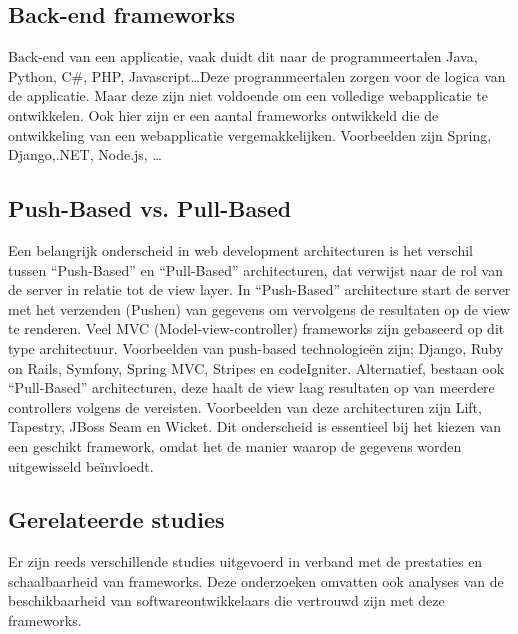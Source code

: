 \documentclass{hogent-article}
\begin{document}
\subsection{Back-end frameworks}%
\label{sub:backend_frameworks}
Back-end van een applicatie, vaak duidt dit naar de programmeertalen Java, Python, C\#, PHP, Ja\-va\-script\ldots  Deze programmeertalen zorgen voor de logica van de applicatie. Maar deze zijn niet voldoende om een volledige webapplicatie te ontwikkelen. Ook hier zijn er een aantal frameworks ontwikkeld die de ontwikkeling van een webapplicatie vergemakkelijken.
Voorbeelden zijn Spring, Django,.NET, Node.js, \ldots\autocite{Kaluza2019}

\subsection{Push-Based vs. Pull-Based}%
Een belangrijk onderscheid in web development architecturen is het verschil tussen ``Push-Based'' en ``Pull-Based'' architecturen, dat verwijst naar de rol van de server in relatie tot de view layer.\autocite{Lomas2022}
\bigbreak
In ``Push-Based'' architecture start de server met het verzenden (Pushen) van gegevens om vervolgens de resultaten op de view te renderen. Veel MVC (Model-view-controller) frameworks zijn gebaseerd op dit type architectuur. Voorbeelden van push-based technologieën zijn; Django, Ruby on Rails, Symfony, Spring MVC, Stripes en codeIgniter.
\bigbreak
Alternatief, bestaan ook ``Pull-Based'' architecturen, deze haalt de view laag resultaten op van meerdere controllers volgens de vereisten. Voorbeelden van deze architecturen zijn Lift, Tapestry, JBoss Seam en Wicket.
\bigbreak
Dit onderscheid is essentieel bij het kiezen van een geschikt framework, omdat het de manier waarop de gegevens worden uitgewisseld beïnvloedt.

\subsection{Ge\-rel\-at\-eerde studies}%
\label{sub:Gerelateerde_studies}
Er zijn reeds verschillende studies uitgevoerd in verband met de pre\-sta\-ties en schaalbaarheid van frameworks\autocite{Daityari2023}.  Deze onderzoeken omvatten ook analyses van de beschikbaarheid van soft\-ware\-ont\-wik\-kel\-aars die vertrouwd zijn met deze frameworks.
\end{document}
